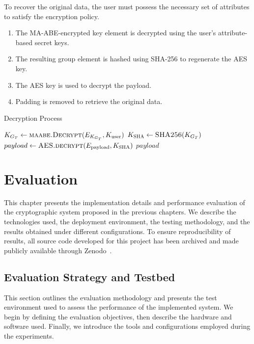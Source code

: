 \documentclass[cic,tc,english]{iiufrgs}
\begin{document}
        To recover the original data, the user must possess the necessary set of attributes to satisfy the encryption policy.

        \begin{enumerate}
            \item The MA-ABE-encrypted key element is decrypted using the user's attribute-based secret keys.
            \item The resulting group element is hashed using SHA-256 to regenerate the AES key.
            \item The AES key is used to decrypt the payload.
            \item Padding is removed to retrieve the original data.
        \end{enumerate}

        \begin{algorithm}
            \caption{Decryption Process}
            \label{alg:decryption_process}
            \scriptsize
            \begin{algorithmic}[1]
                \State $K_{G_T} \gets \textsc{maabe.Decrypt}(E_{K_{G_T}}, K_{\text{user}})$
                \State $K_{\textsc{SHA}} \gets \textsc{SHA256}(K_{G_T})$
                \State $payload \gets \textsc{AES.decrypt}(E_{\text{payload}}, K_{\text{SHA}})$
                \State \Return $payload$
            \EndProcedure
            \end{algorithmic}
        \end{algorithm}





\chapter{Evaluation}
    \label{chap:evaluation}
    This chapter presents the implementation details and performance evaluation of the cryptographic system proposed in the previous chapters. We describe the technologies used, the deployment environment, the testing methodology, and the results obtained under different configurations. To ensure reproducibility of results, all source code developed for this project has been archived and made publicly available through Zenodo~\citep{maabeflask}.

    

    \section{Evaluation Strategy and Testbed}
        \label{sec:evaluation-setup}
        This section outlines the evaluation methodology and presents the test environment used to assess the performance of the implemented system. We begin by defining the evaluation objectives, then describe the hardware and software used. Finally, we introduce the tools and configurations employed during the experiments.
\end{document}
